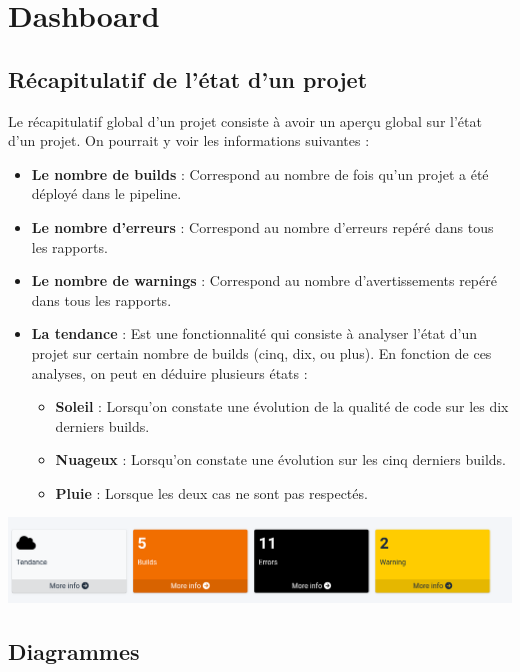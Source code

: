 	\section{Dashboard}
		\subsection{Récapitulatif de l'état d'un projet}
			Le récapitulatif global d’un projet consiste à avoir un aperçu global sur l’état d’un projet. On pourrait y voir les informations suivantes :\\
			\begin{itemize}
				\item \textbf{Le nombre de builds} : Correspond au nombre de fois qu’un projet a été déployé dans le pipeline.
				\item \textbf{Le nombre d’erreurs} : Correspond au nombre d’erreurs repéré dans tous les rapports.
				\item \textbf{Le nombre de warnings} : Correspond au nombre d’avertissements repéré dans tous les rapports.
				\item  \textbf{La tendance} : Est une fonctionnalité qui consiste à analyser l’état d’un projet sur certain nombre de builds (cinq, dix, ou plus). En fonction de ces analyses, on peut en déduire plusieurs états : 
					\begin{itemize}
						\item \textbf{Soleil} : Lorsqu’on constate une évolution de la qualité de code sur les dix derniers builds.
						\item \textbf{Nuageux} : Lorsqu’on constate une évolution sur les cinq derniers builds.
						\item \textbf{Pluie} : Lorsque les deux cas ne sont pas respectés.
					\end{itemize}
			\end{itemize}
		\begin{center}
			\includegraphics[scale=0.4]{chap_3/recapt.png}
			\label{Recaptulatif}
		\end{center}
		\subsection{Diagrammes}
